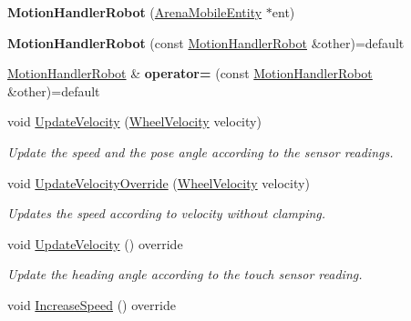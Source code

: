 \begin{DoxyCompactItemize}
\item 
{\bfseries Motion\+Handler\+Robot} (\hyperlink{classArenaMobileEntity}{Arena\+Mobile\+Entity} $\ast$ent)\hypertarget{classMotionHandlerRobot_a4b52a0b181837a8d63c39f71811d691b}{}\label{classMotionHandlerRobot_a4b52a0b181837a8d63c39f71811d691b}

\item 
{\bfseries Motion\+Handler\+Robot} (const \hyperlink{classMotionHandlerRobot}{Motion\+Handler\+Robot} \&other)=default\hypertarget{classMotionHandlerRobot_a66445cc9057e3ef9298b5bd239df6d4e}{}\label{classMotionHandlerRobot_a66445cc9057e3ef9298b5bd239df6d4e}

\item 
\hyperlink{classMotionHandlerRobot}{Motion\+Handler\+Robot} \& {\bfseries operator=} (const \hyperlink{classMotionHandlerRobot}{Motion\+Handler\+Robot} \&other)=default\hypertarget{classMotionHandlerRobot_a48181f197ffb864f16e29721ad964e4a}{}\label{classMotionHandlerRobot_a48181f197ffb864f16e29721ad964e4a}

\item 
void \hyperlink{classMotionHandlerRobot_a8695af8ee74cf1a5b11ec9cf87d67366}{Update\+Velocity} (\hyperlink{structWheelVelocity}{Wheel\+Velocity} velocity)
\begin{DoxyCompactList}\small\item\em Update the speed and the pose angle according to the sensor readings. \end{DoxyCompactList}\item 
void \hyperlink{classMotionHandlerRobot_ae68f25d22cc511d6e4ec6b7e30744301}{Update\+Velocity\+Override} (\hyperlink{structWheelVelocity}{Wheel\+Velocity} velocity)
\begin{DoxyCompactList}\small\item\em Updates the speed according to velocity without clamping. \end{DoxyCompactList}\item 
void \hyperlink{classMotionHandlerRobot_acd2cdb615d806dcf809142e84569ca9d}{Update\+Velocity} () override\hypertarget{classMotionHandlerRobot_acd2cdb615d806dcf809142e84569ca9d}{}\label{classMotionHandlerRobot_acd2cdb615d806dcf809142e84569ca9d}

\begin{DoxyCompactList}\small\item\em Update the heading angle according to the touch sensor reading. \end{DoxyCompactList}\item 
void \hyperlink{classMotionHandlerRobot_a93ea16501b7b8c0bd78edb2681aa3b6d}{Increase\+Speed} () override\hypertarget{classMotionHandlerRobot_a93ea16501b7b8c0bd78edb2681aa3b6d}{}\label{classMotionHandlerRobot_a93ea16501b7b8c0bd78edb2681aa3b6d}


\end{DoxyCompactItemize}

